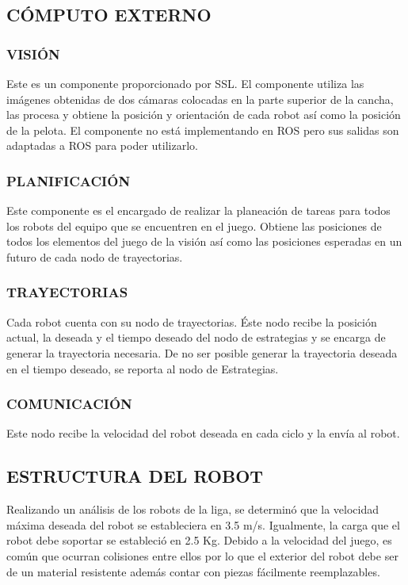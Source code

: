 \documentclass[twocolumn,10pt]{amrob}
\begin{document}
\subsection*{CÓMPUTO EXTERNO}
\subsubsection*{VISIÓN}
Este es un componente proporcionado por SSL. El componente utiliza las imágenes obtenidas de dos cámaras colocadas en la parte superior de la cancha, las procesa y obtiene la posición y orientación de cada robot así como la posición de la pelota. El componente no está implementando en ROS pero sus salidas son adaptadas a ROS para poder utilizarlo.
\subsubsection*{PLANIFICACIÓN}
Este componente es el encargado de realizar la planeación de tareas para todos los robots del equipo que se encuentren en el juego. Obtiene las posiciones de todos los elementos del juego de la visión así como las posiciones esperadas en un futuro de cada nodo de trayectorias.
\subsubsection*{TRAYECTORIAS}
Cada robot cuenta con su nodo de trayectorias. Éste nodo recibe la posición actual, la deseada y el tiempo deseado del nodo de estrategias y se encarga de generar la trayectoria necesaria. De no ser posible generar la trayectoria deseada en el tiempo deseado, se reporta al nodo de Estrategias.
\subsubsection*{COMUNICACIÓN}
Este nodo recibe la velocidad del robot deseada en cada ciclo y la envía al robot. 
\subsection*{ESTRUCTURA DEL ROBOT}

Realizando un análisis de los robots de la liga, se determinó que la velocidad máxima deseada del robot se estableciera en 3.5 m/s. Igualmente, la carga que el robot debe soportar se estableció en 2.5 Kg. Debido a la velocidad del juego, es común que ocurran colisiones entre ellos por lo que el exterior del robot debe ser de un material resistente además contar con piezas fácilmente reemplazables.\par
\end{document}
